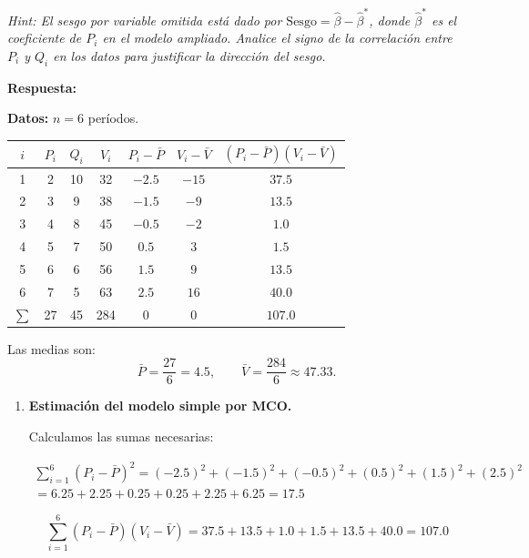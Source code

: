 \documentclass[10pt,a4paper]{article}
\begin{document}
\begin{enumerate}
\begin{enumerate}[label=(\alph*)]
\textit{Hint: El sesgo por variable omitida está dado por $\text{Sesgo} = \hat{\beta} - 
\hat{\beta}^*$, donde $\hat{\beta}^*$ es el coeficiente de $P_i$ en el modelo ampliado. 
Analice el signo de la correlación entre $P_i$ y $Q_i$ en los datos para justificar la 
dirección del sesgo.}

{\color{blue} \textbf{Respuesta:}

\textbf{Datos:} $n = 6$ períodos.
 
\begin{center}
\begin{tabular}{ccccccc}
\toprule
$i$ & $P_i$ & $Q_i$ & $V_i$ & $P_i - \bar{P}$ & $V_i - \bar{V}$ & $(P_i-\bar{P})(V_i-\bar{V})$ \\
\midrule
1 & 2 & 10 & 32 & $-2.5$ & $-15$ & $37.5$ \\
2 & 3 &  9 & 38 & $-1.5$ & $-9$  & $13.5$ \\
3 & 4 &  8 & 45 & $-0.5$ & $-2$  & $1.0$  \\
4 & 5 &  7 & 50 & $0.5$  & $3$   & $1.5$  \\
5 & 6 &  6 & 56 & $1.5$  & $9$   & $13.5$ \\
6 & 7 &  5 & 63 & $2.5$  & $16$  & $40.0$ \\
\midrule
$\sum$ & 27 & 45 & 284 & 0 & 0 & $107.0$ \\
\bottomrule
\end{tabular}
\end{center}
 
\medskip
Las medias son:
$$\bar{P} = \frac{27}{6} = 4.5, \qquad
  \bar{V} = \frac{284}{6} \approx 47.33.$$
 
\begin{enumerate}[label=(\alph*)]
 
\item \textbf{Estimación del modelo simple por MCO.}
 
\medskip
Calculamos las sumas necesarias:

\begin{eqnarray*}
    \sum_{i=1}^6 (P_i - \bar{P})^2
= (-2.5)^2+(-1.5)^2+(-0.5)^2+(0.5)^2+(1.5)^2+(2.5)^2\\
= 6.25+2.25+0.25+0.25+2.25+6.25 = 17.5
\end{eqnarray*}



 
\[
\sum_{i=1}^6 (P_i - \bar{P})(V_i - \bar{V})
= 37.5 + 13.5 + 1.0 + 1.5 + 13.5 + 40.0 = 107.0
\]
 

\end{enumerate}}
\end{enumerate}
\end{enumerate}
\end{document}
